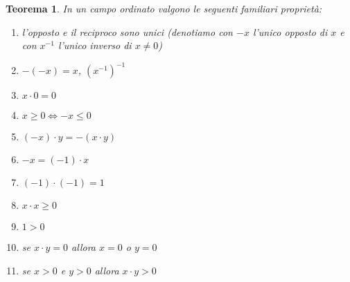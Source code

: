 \documentclass[italian,a4paper,oneside,headinclude]{scrbook}
\newtheorem{theorem}{Teorema}
\begin{document}
\begin{theorem}
In un campo ordinato valgono le seguenti
familiari proprietà:
\begin{enumerate}
  \item l'opposto e il reciproco sono unici (denotiamo con $-x$ l'unico opposto di $x$ e con $x^{-1}$ l'unico inverso di $x\neq 0$)
  \item $-(-x) = x$, $\left(x^{-1}\right)^{-1}$
  \item $x \cdot 0 = 0$
  \item $x\ge 0 \iff -x \le 0$
  \item $(-x)\cdot y = -(x\cdot y)$
  \item $-x = (-1)\cdot x$
  \item $(-1)\cdot(-1) = 1$
  \item $x\cdot x \ge 0$
  \item $1 > 0$
  \item se $x\cdot y = 0$ allora $x = 0$ o $y = 0$
  \item se $x>0$ e $y>0$  allora $x\cdot y > 0$
\end{enumerate}
\end{theorem}
%
\end{document}
